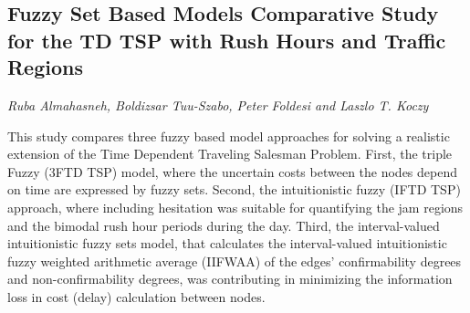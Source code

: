 \documentclass[../booklet.tex]{subfiles}
\begin{document}
\subsection[Fuzzy Set Based Models Comparative Study for the TD TSP with Rush Hours and Traffic Regions. {\it Ruba Almahasneh, Boldizsar Tuu-Szabo, Peter Foldesi and Laszlo T. Koczy}]{Fuzzy Set Based Models Comparative Study for the TD TSP with Rush Hours and Traffic Regions}
   

\begin{center}
  {\it Ruba Almahasneh, Boldizsar Tuu-Szabo, Peter Foldesi and Laszlo T. Koczy}
\end{center}

\vskip 0.8cm

This study compares three fuzzy based model approaches for solving a realistic extension of the Time Dependent Traveling Salesman Problem. First, the triple Fuzzy (3FTD TSP) model, where the uncertain costs between the nodes depend on time are expressed by fuzzy sets. Second, the intuitionistic fuzzy (IFTD TSP) approach, where including hesitation was suitable for quantifying the jam regions and the bimodal rush hour periods during the day. Third, the interval-valued intuitionistic fuzzy sets model, that calculates the interval-valued intuitionistic fuzzy weighted arithmetic average (IIFWAA) of the edges' confirmability degrees and non-confirmability degrees, was contributing in minimizing the information loss in cost (delay) calculation between nodes.

\end{document}
